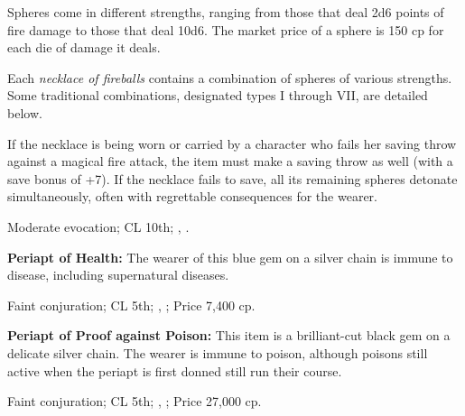 Spheres come in different strengths, ranging from those that deal 2d6 points of fire damage to those that deal 10d6. The market price of a sphere is 150 cp for each die of damage it deals.

Each \emph{necklace of fireballs} contains a combination of spheres of various strengths. Some traditional combinations, designated types I through VII, are detailed below.


If the necklace is being worn or carried by a character who fails her saving throw against a magical fire attack, the item must make a saving throw as well (with a save bonus of +7). If the necklace fails to save, all its remaining spheres detonate simultaneously, often with regrettable consequences for the wearer.

Moderate evocation; CL 10th; , .


\textbf{Periapt of Health:} The wearer of this blue gem on a silver chain is immune to disease, including supernatural diseases.

Faint conjuration; CL 5th; , ; Price 7,400 cp.


\textbf{Periapt of Proof against Poison:} This item is a brilliant-cut black gem on a delicate silver chain. The wearer is immune to poison, although poisons still active when the periapt is first donned still run their course.

Faint conjuration; CL 5th; , ; Price 27,000 cp.


